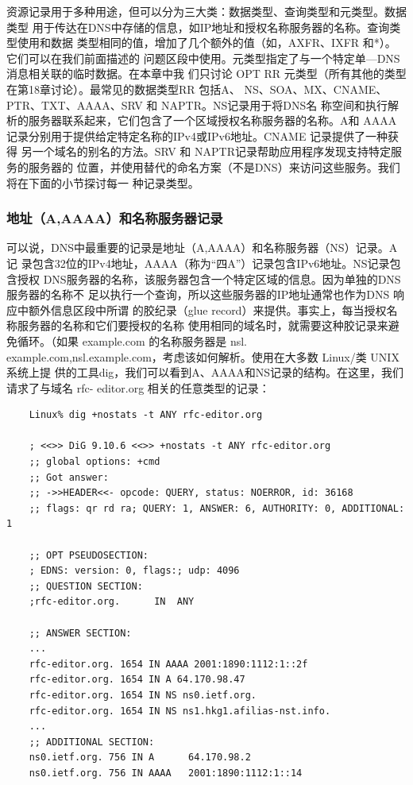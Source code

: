 资源记录用于多种用途，但可以分为三大类：数据类型、查询类型和元类型。数据类型
用于传达在DNS中存储的信息，如IP地址和授权名称服务器的名称。查询类型使用和数据
类型相同的值，增加了几个额外的值（如，AXFR、IXFR 和*）。它们可以在我们前面描述的
问题区段中使用。元类型指定了与一个特定单—DNS 消息相关联的临时数据。在本章中我
们只讨论 OPT RR 元类型（所有其他的类型在第18章讨论）。最常见的数据类型RR 包括A、
NS、SOA、MX、CNAME、PTR、TXT、AAAA、SRV 和 NAPTR。NS记录用于将DNS名
称空间和执行解析的服务器联系起来，它们包含了一个区域授权名称服务器的名称。A和
AAAA记录分别用于提供给定特定名称的IPv4或IPv6地址。CNAME 记录提供了一种获得
另一个域名的别名的方法。SRV 和 NAPTR记录帮助应用程序发现支持特定服务的服务器的
位置，并使用替代的命名方案（不是DNS）来访问这些服务。我们将在下面的小节探讨每一
种记录类型。

\subsubsection{地址（A,AAAA）和名称服务器记录}

可以说，DNS中最重要的记录是地址（A,AAAA）和名称服务器（NS）记录。A记
录包含32位的IPv4地址，AAAA（称为“四A”）记录包含IPv6地址。NS记录包含授权
DNS服务器的名称，该服务器包含一个特定区域的信息。因为单独的DNS服务器的名称不
足以执行一个查询，所以这些服务器的IP地址通常也作为DNS 响应中额外信息区段中所谓
的胶纪录（glue record）来提供。事实上，每当授权名称服务器的名称和它们要授权的名称
使用相同的域名时，就需要这种胶记录来避免循环。（如果 example.com 的名称服务器是 nsl.
example.com,nsl.example.com，考虑该如何解析。使用在大多数 Linux/类 UNIX 系统上提
供的工具dig，我们可以看到A、AAAA和NS记录的结构。在这里，我们请求了与域名 rfc-
editor.org 相关的任意类型的记录：

\begin{verbatim}
    Linux% dig +nostats -t ANY rfc-editor.org

    ; <<>> DiG 9.10.6 <<>> +nostats -t ANY rfc-editor.org
    ;; global options: +cmd
    ;; Got answer:
    ;; ->>HEADER<<- opcode: QUERY, status: NOERROR, id: 36168
    ;; flags: qr rd ra; QUERY: 1, ANSWER: 6, AUTHORITY: 0, ADDITIONAL: 1

    ;; OPT PSEUDOSECTION:
    ; EDNS: version: 0, flags:; udp: 4096
    ;; QUESTION SECTION:
    ;rfc-editor.org.      IN  ANY

    ;; ANSWER SECTION:
    ...
    rfc-editor.org. 1654 IN AAAA 2001:1890:1112:1::2f
    rfc-editor.org. 1654 IN A 64.170.98.47
    rfc-editor.org. 1654 IN NS ns0.ietf.org.
    rfc-editor.org. 1654 IN NS ns1.hkg1.afilias-nst.info.
    ...
    ;; ADDITIONAL SECTION:
    ns0.ietf.org. 756 IN A      64.170.98.2
    ns0.ietf.org. 756 IN AAAA   2001:1890:1112:1::14
\end{verbatim}

